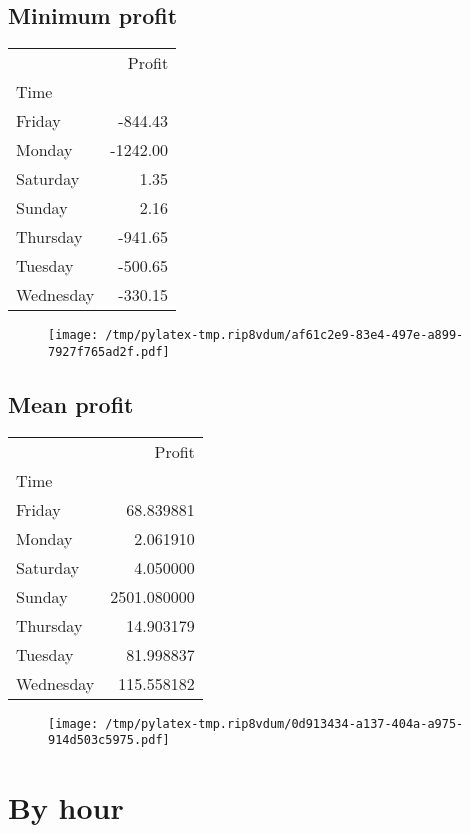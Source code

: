 \documentclass{article}%
\begin{document}
\subsection{Minimum profit }%
\label{subsec:Minimumprofit}%
\begin{tabular}{lr}
\toprule
{} &   Profit \\
Time      &          \\
\midrule
Friday    &  -844.43 \\
Monday    & -1242.00 \\
Saturday  &     1.35 \\
Sunday    &     2.16 \\
Thursday  &  -941.65 \\
Tuesday   &  -500.65 \\
Wednesday &  -330.15 \\
\bottomrule
\end{tabular}
%


\begin{figure}[htbp]%
\centering%
\texttt{[image: /tmp/pylatex-tmp.rip8vdum/af61c2e9-83e4-497e-a899-7927f765ad2f.pdf]}%
\end{figure}

%
\newpage %
\subsection{Mean profit }%
\label{subsec:Meanprofit}%
\begin{tabular}{lr}
\toprule
{} &       Profit \\
Time      &              \\
\midrule
Friday    &    68.839881 \\
Monday    &     2.061910 \\
Saturday  &     4.050000 \\
Sunday    &  2501.080000 \\
Thursday  &    14.903179 \\
Tuesday   &    81.998837 \\
Wednesday &   115.558182 \\
\bottomrule
\end{tabular}
%


\begin{figure}[htbp]%
\centering%
\texttt{[image: /tmp/pylatex-tmp.rip8vdum/0d913434-a137-404a-a975-914d503c5975.pdf]}%
\end{figure}

%
\newpage %
\section{By hour}%
\label{sec:Byhour}%
\end{document}
